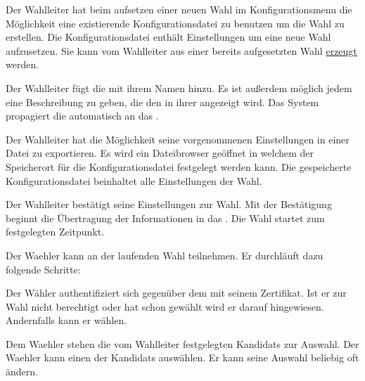 \documentclass[parskip=full,11pt,twoside]{scrartcl}
\begin{document}
Der \gls{Wahlleiter} hat beim aufsetzen einer neuen \gls{Wahl} im \gls{Konfigurationsmenu} die Möglichkeit eine existierende Konfigurationsdatei zu benutzen um die \gls{Wahl} zu erstellen.
Die Konfigurationsdatei enthält Einstellungen um eine neue \gls{Wahl} aufzusetzen. Sie kann vom \gls{Wahlleiter} aus einer bereits aufgesetzten \gls{Wahl} \hyperref[fnc:export]{erzeugt} werden.

Der \gls{Wahlleiter} fügt die  mit ihrem Namen hinzu. Es ist außerdem möglich jedem  eine Beschreibung zu geben, die den  in ihrer  angezeigt wird. Das System propagiert die  automatisch an das .

Der \gls{Wahlleiter} hat die Möglichkeit seine vorgenommenen Einstellungen in einer Datei zu exportieren.
Es wird ein \gls{Dateibrowser} geöffnet in welchem der Speicherort für die Konfigurationsdatei festgelegt werden kann.
Die gespeicherte Konfigurationsdatei beinhaltet alle Einstellungen der \gls{Wahl}.

Der \gls{Wahlleiter} bestätigt seine Einstellungen zur \gls{Wahl}. Mit der Bestätigung beginnt die Übertragung der Informationen in das . Die \gls{Wahl} startet zum festgelegten Zeitpunkt.

Der \gls{Waehler} kann an der laufenden \gls{Wahl} teilnehmen. Er durchläuft dazu folgende Schritte:

Der Wähler authentifiziert sich gegenüber dem  mit seinem \gls{Zertifikat}.
Ist er zur \gls{Wahl} nicht berechtigt oder hat schon gewählt wird er darauf hingewiesen.
Andernfalls kann er wählen.

Dem \gls{Waehler} stehen die vom \gls{Wahlleiter} festgelegten \glspl{Kandidat} zur Auswahl.
Der \gls{Waehler} kann einen der \glspl{Kandidat} auswählen.
Er kann seine Auswahl beliebig oft ändern.
\end{document}
